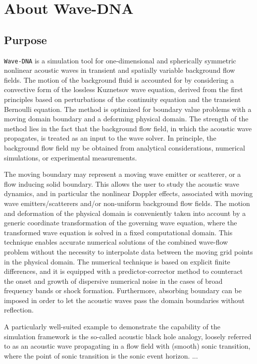 \chapter{About Wave-DNA}
\label{chap:About Wave-DNA}

\section{Purpose}
\label{sec:Purpose}

{\tt Wave-DNA} is a simulation tool for one-dimensional and spherically symmetric nonlinear acoustic waves in transient and spatially variable background flow fields. The motion of the background fluid is accounted for by considering a convective form of the lossless Kuznetsov wave equation, derived from the first principles based on perturbations of the continuity equation and the transient Bernoulli equation. The method is optimized for boundary value problems with a moving domain boundary and a deforming physical domain. The strength of the method lies in the fact that the background flow field, in which the acoustic wave propagates, is treated as an input to the wave solver. In principle, the background flow field my be obtained from analytical considerations, numerical simulations, or experimental measurements. 

The moving boundary may represent a moving wave emitter or scatterer, or a flow inducing solid boundary. This allows the user to study the acoustic wave dynamics, and in particular the nonlinear Doppler effects, associated with moving wave emitters/scatterers and/or non-uniform background flow fields. The motion and deformation of the physical domain is conveniently taken into account by a generic coordinate transformation of the governing wave equation, where the transformed wave equation is solved in a fixed computational domain. This technique enables accurate numerical solutions of the combined wave-flow problem without the necessity to interpolate data between the moving grid points in the physical domain. The numerical technique is based on explicit finite differences, and it is equipped with a predictor-corrector method to counteract the onset and growth of dispersive numerical noise in the cases of broad frequency bands or shock formation. Furthermore, absorbing boundary can be imposed in order to let the acoustic waves pass the domain boundaries without reflection.

A particularly well-suited example to demonstrate the capability of the simulation framework is the so-called acoustic black hole analogy, loosely referred to as an acoustic wave propagating in a flow field with (smooth) sonic transition, where the point of sonic transition is the sonic event horizon. ...





